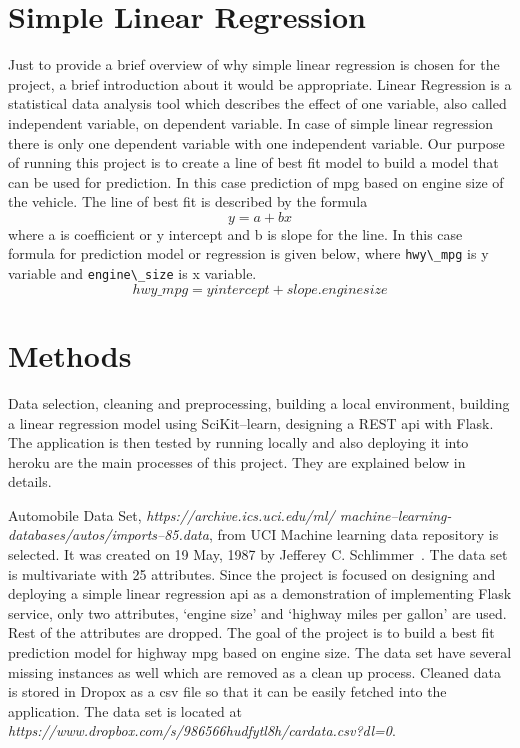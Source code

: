 \section{Simple Linear Regression}
  Just to provide a brief overview of why simple linear regression is
  chosen for the project, a brief introduction about it would be
  appropriate. Linear Regression is a statistical data analysis tool
  which describes the effect of one variable, also called independent
  variable, on dependent variable. In case of simple linear regression
  there is only one dependent variable with one independent variable.
  Our purpose of running this project
  is to create a line of best fit model to build a model that can be used
  for prediction. In this case prediction of mpg based on engine size
  of the vehicle. The line of best fit is described by the
  formula \[y = a + bx\] where a is coefficient or y intercept and b is
  slope for the line. In this case formula for prediction model or
  regression is given below, where \verb|hwy\_mpg| is y variable and
  \verb|engine\_size| is x variable.
  \[hwy\_mpg = yintercept + slope.enginesize\] 
\section{Methods}
  Data selection, cleaning and preprocessing, building a local
  environment, building a linear regression model using SciKit--learn,
  designing a REST api with Flask. The application is then tested by running 
  locally and also deploying it into heroku are the main
  processes of this project. They are explained below in details. 

   Automobile Data Set, \textit{https://archive.ics.uci.edu/ml/
   machine--learning-databases/autos/imports--85.data}, from UCI
   Machine learning data repository is selected. It was created
   on 19 May, 1987 by Jefferey C. Schlimmer~\cite{hid-sp18-415-uci-com}. The
   data set is multivariate with 25 attributes. Since the project
   is focused on designing and deploying a simple linear
   regression api as a demonstration of implementing Flask service,
   only two attributes, `engine size' and `highway miles per gallon'
   are used. Rest of the attributes are dropped. The goal of the
   project is to build a best fit prediction model for highway mpg
   based on engine size. The data set have several missing instances
   as well which are removed as a clean up process. Cleaned data is stored in
   Dropox as a csv   file so that it can be easily fetched into the
   application. The data set is located at 
 \textit{https://www.dropbox.com/s/986566hudfytl8h/cardata.csv?dl=0}.
  
